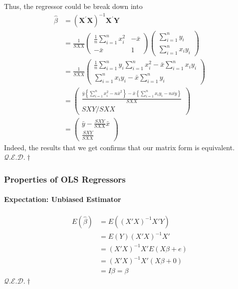\documentclass[10pt]{article}
\newcommand{\qed}{\hfill $\mathcal{Q}.\mathcal{E}.\mathcal{D}.\dagger$}
\begin{document}
Thus, the regressor could be break down into
\begin{align*}
	\hat{\beta} 
	&=\left(\mathbf{X}^{\prime} \mathbf{X}\right)^{-1} \mathbf{X}^{\prime} \mathbf{Y} \\
	&=\frac{1}{S X X}\left(\begin{array}{cc}{\frac{1}{n} \sum_{i=1}^{n} x_{i}^{2}} & {-\bar{x}} \\ {-\bar{x}} & {1}\end{array}\right)\left(\begin{array}{c}{\sum_{i=1}^{n} y_{i}} \\ {\sum_{i=1}^{n} x_{i} y_{i}}\end{array}\right) \\
	&= \frac{1}{S X X}\left(\begin{array}{c}{\frac{1}{n} \sum_{i=1}^{n} y_{i} \sum_{i=1}^{n} x_{i}^{2}-\bar{x} \sum_{i=1}^{n} x_{i} y_{i}} \\ {\sum_{i=1}^{n} x_{i} y_{i}-\bar{x} \sum_{i=1}^{n} y_{i}}\end{array}\right) \\
	&= \begin{pmatrix}
		\frac{\bar{y}\left\{\sum_{i=1}^{n} x_{i}^{2}-n \bar{x}^{2}\right\}-\bar{x}\left\{\sum_{i=1}^{n} x_{i} y_{i}-n \overline{x y}\right\}}{S X X} \\
		{S X Y}/{S X X}
	\end{pmatrix} \\
	&= \left(\begin{array}{l}{\bar{y}-\frac{S X Y}{S X X} \bar{x}} \\ {\frac{S X Y}{S X X}}\end{array}\right)
\end{align*}
Indeed, the results that we get confirms that our matrix form is equivalent. \qed 


\subsubsection{Properties of OLS Regressors}
\paragraph{Expectation: Unbiased Estimator}
\begin{align*}
    E(\hat{\beta}) &= E((X'X)^{-1}X'Y) \\
    &= E(Y)(X'X)^{-1}X' \\
    &= (X'X)^{-1}X' E(X\beta + e) \\
    &= (X'X)^{-1}X' (X\beta + 0) \\
    &= I\beta = \beta
\end{align*}
\qed
\end{document}
